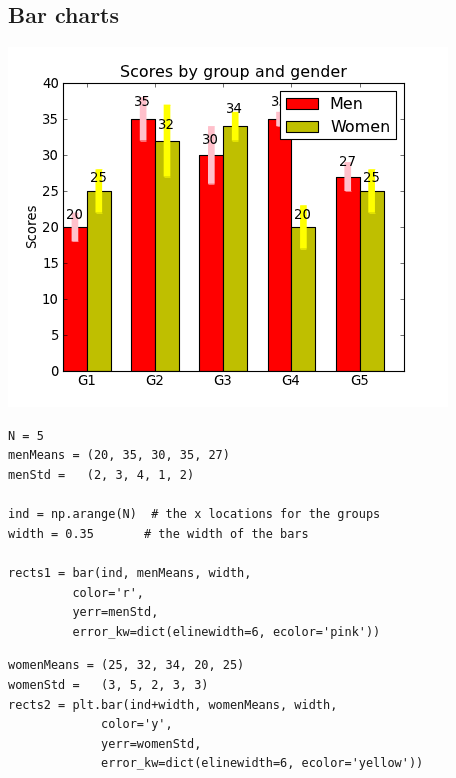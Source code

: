 \subsection{Bar charts}

\begin{frame}
\begin{center}
  \includegraphics[scale=.5]{../figures/matplotlib/barchart_demo1.png}
\end{center}
\end{frame}

\begin{frame}[fragile]
\begin{block}{}
\begin{verbatim}
N = 5
menMeans = (20, 35, 30, 35, 27)
menStd =   (2, 3, 4, 1, 2)

ind = np.arange(N)  # the x locations for the groups
width = 0.35       # the width of the bars

rects1 = bar(ind, menMeans, width,
         color='r',
         yerr=menStd,
         error_kw=dict(elinewidth=6, ecolor='pink'))
\end{verbatim}
\end{block}
\end{frame}

\begin{frame}[fragile]
\begin{block}{}
\begin{verbatim}
womenMeans = (25, 32, 34, 20, 25)
womenStd =   (3, 5, 2, 3, 3)
rects2 = plt.bar(ind+width, womenMeans, width,
             color='y',
             yerr=womenStd,
             error_kw=dict(elinewidth=6, ecolor='yellow'))
\end{verbatim}
\end{block}
\end{frame}

